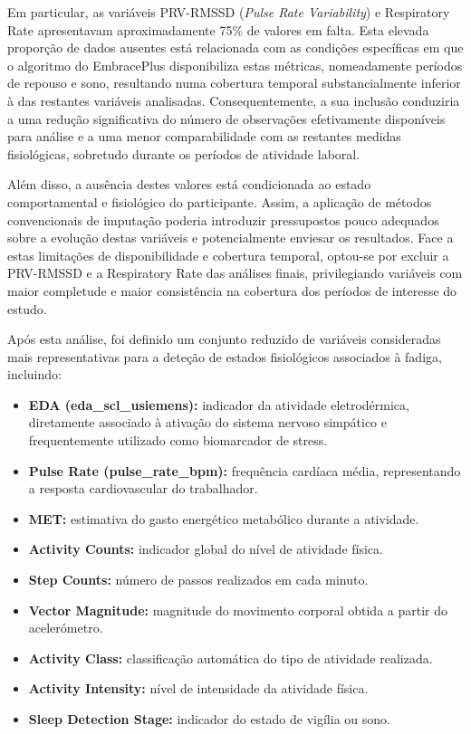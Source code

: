 Em particular, as variáveis PRV-RMSSD (\textit{Pulse Rate Variability}) e Respiratory Rate apresentavam aproximadamente 75\% de valores em falta. Esta elevada proporção de dados ausentes está relacionada com as condições específicas em que o algoritmo do EmbracePlus disponibiliza estas métricas, nomeadamente períodos de repouso e sono, resultando numa cobertura temporal substancialmente inferior à das restantes variáveis analisadas. Consequentemente, a sua inclusão conduziria a uma redução significativa do número de observações efetivamente disponíveis para análise e a uma menor comparabilidade com as restantes medidas fisiológicas, sobretudo durante os períodos de atividade laboral.

Além disso, a ausência destes valores está condicionada ao estado comportamental e fisiológico do participante. Assim, a aplicação de métodos convencionais de imputação poderia introduzir pressupostos pouco adequados sobre a evolução destas variáveis e potencialmente enviesar os resultados. Face a estas limitações de disponibilidade e cobertura temporal, optou-se por excluir a PRV-RMSSD e a Respiratory Rate das análises finais, privilegiando variáveis com maior completude e maior consistência na cobertura dos períodos de interesse do estudo.

Após esta análise, foi definido um conjunto reduzido de variáveis consideradas mais representativas para a deteção de estados fisiológicos associados à fadiga, incluindo:

\begin{itemize}
\item \textbf{EDA (eda\_scl\_usiemens):} indicador da atividade eletrodérmica, diretamente associado à ativação do sistema nervoso simpático e frequentemente utilizado como biomarcador de stress.
\item \textbf{Pulse Rate (pulse\_rate\_bpm):} frequência cardíaca média, representando a resposta cardiovascular do trabalhador.
\item \textbf{MET:} estimativa do gasto energético metabólico durante a atividade.
\item \textbf{Activity Counts:} indicador global do nível de atividade física.
\item \textbf{Step Counts:} número de passos realizados em cada minuto.
\item \textbf{Vector Magnitude:} magnitude do movimento corporal obtida a partir do acelerómetro.
\item \textbf{Activity Class:} classificação automática do tipo de atividade realizada.
\item \textbf{Activity Intensity:} nível de intensidade da atividade física.
\item \textbf{Sleep Detection Stage:} indicador do estado de vigília ou sono.
\end{itemize}

